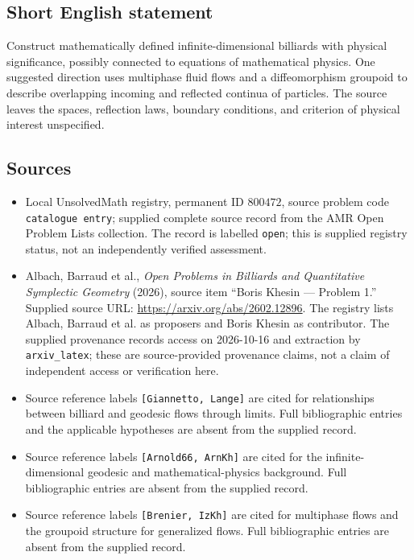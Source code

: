 \documentclass[11pt]{article}
\begin{document}
\subsection{Short English statement}
Construct mathematically defined infinite-dimensional billiards with physical significance, possibly connected to equations of mathematical physics. One suggested direction uses multiphase fluid flows and a diffeomorphism groupoid to describe overlapping incoming and reflected continua of particles. The source leaves the spaces, reflection laws, boundary conditions, and criterion of physical interest unspecified.
\subsection{Sources}
\begin{itemize}
\item Local UnsolvedMath registry, permanent ID \(800472\), source problem code \texttt{catalogue entry}; supplied complete source record from the AMR Open Problem Lists collection. The record is labelled \texttt{open}; this is supplied registry status, not an independently verified assessment.
\item Albach, Barraud et al., \emph{Open Problems in Billiards and Quantitative Symplectic Geometry} (2026), source item ``Boris Khesin --- Problem 1.'' Supplied source URL: \url{https://arxiv.org/abs/2602.12896}. The registry lists Albach, Barraud et al. as proposers and Boris Khesin as contributor. The supplied provenance records access on 2026-10-16 and extraction by \texttt{arxiv\_latex}; these are source-provided provenance claims, not a claim of independent access or verification here.
\item Source reference labels \texttt{[Giannetto, Lange]} are cited for relationships between billiard and geodesic flows through limits. Full bibliographic entries and the applicable hypotheses are absent from the supplied record.
\item Source reference labels \texttt{[Arnold66, ArnKh]} are cited for the infinite-dimensional geodesic and mathematical-physics background. Full bibliographic entries are absent from the supplied record.
\item Source reference labels \texttt{[Brenier, IzKh]} are cited for multiphase flows and the groupoid structure for generalized flows. Full bibliographic entries are absent from the supplied record.
\end{itemize}
\end{document}
